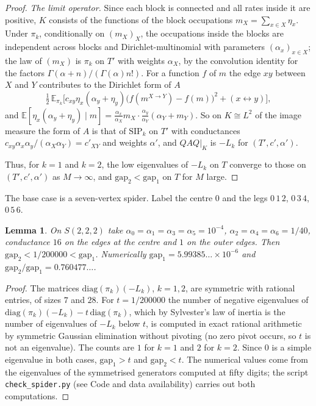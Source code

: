 \documentclass[11pt]{article}
\newtheorem{lemma}[theorem]{Lemma}
\theoremstyle{remark}
\newcommand{\gap}{\mathrm{gap}}
\begin{document}
\begin{proof}
\emph{The limit operator.} Since each block is connected and all rates inside it are positive, $K$ consists of the functions of the block occupations $m_X=\sum_{x\in X}\eta_x$. Under $\pi_k$, conditionally on $(m_X)_X$, the occupations inside the blocks are independent across blocks and Dirichlet-multinomial with parameters $(\alpha_x)_{x\in X}$; the law of $(m_X)$ is $\pi_k$ on $T'$ with weights $\alpha_X$, by the convolution identity for the factors $\Gamma(\alpha+n)/(\Gamma(\alpha)n!)$. For a function $f$ of $m$ the edge $xy$ between $X$ and $Y$ contributes to the Dirichlet form of $A$
\[
\tfrac12\,\mathbb{E}_{\pi_k}\bigl[c_{xy}\eta_x(\alpha_y+\eta_y)\bigl(f(m^{X\to Y})-f(m)\bigr)^2+(x\leftrightarrow y)\bigr],
\]
and $\mathbb{E}[\eta_x(\alpha_y+\eta_y)\mid m]=\frac{\alpha_x}{\alpha_X}m_X\cdot\frac{\alpha_y}{\alpha_Y}(\alpha_Y+m_Y)$. So on $K\cong L^2$ of the image measure the form of $A$ is that of $\mathrm{SIP}_k$ on $T'$ with conductances $c_{xy}\alpha_x\alpha_y/(\alpha_X\alpha_Y)=c'_{XY}$ and weights $\alpha'$, and $QAQ|_K$ is $-L_k$ for $(T',c',\alpha')$.

Thus, for $k=1$ and $k=2$, the low eigenvalues of $-L_k$ on $T$ converge to those on $(T',c',\alpha')$ as $M\to\infty$, and $\gap_2<\gap_1$ on $T$ for $M$ large.
\end{proof}

The base case is a seven-vertex spider. Label the centre $0$ and the legs $0\,1\,2$, $0\,3\,4$, $0\,5\,6$.

\begin{lemma}\label{lem:spider}
On $S(2,2,2)$ take $\alpha_0=\alpha_1=\alpha_3=\alpha_5=10^{-4}$, $\alpha_2=\alpha_4=\alpha_6=1/40$, conductance $16$ on the edges at the centre and $1$ on the outer edges. Then $\gap_2<1/200000<\gap_1$. Numerically $\gap_1=5.99385\dots\times10^{-6}$ and $\gap_2/\gap_1=0.760477\dots$.
\end{lemma}

\begin{proof}
The matrices $\mathrm{diag}(\pi_k)(-L_k)$, $k=1,2$, are symmetric with rational entries, of sizes $7$ and $28$. For $t=1/200000$ the number of negative eigenvalues of $\mathrm{diag}(\pi_k)(-L_k)-t\,\mathrm{diag}(\pi_k)$, which by Sylvester's law of inertia is the number of eigenvalues of $-L_k$ below $t$, is computed in exact rational arithmetic by symmetric Gaussian elimination without pivoting (no zero pivot occurs, so $t$ is not an eigenvalue). The counts are $1$ for $k=1$ and $2$ for $k=2$. Since $0$ is a simple eigenvalue in both cases, $\gap_1>t$ and $\gap_2<t$. The numerical values come from the eigenvalues of the symmetrised generators computed at fifty digits; the script \texttt{check\_spider.py} (see Code and data availability) carries out both computations.
\end{proof}
\end{document}
